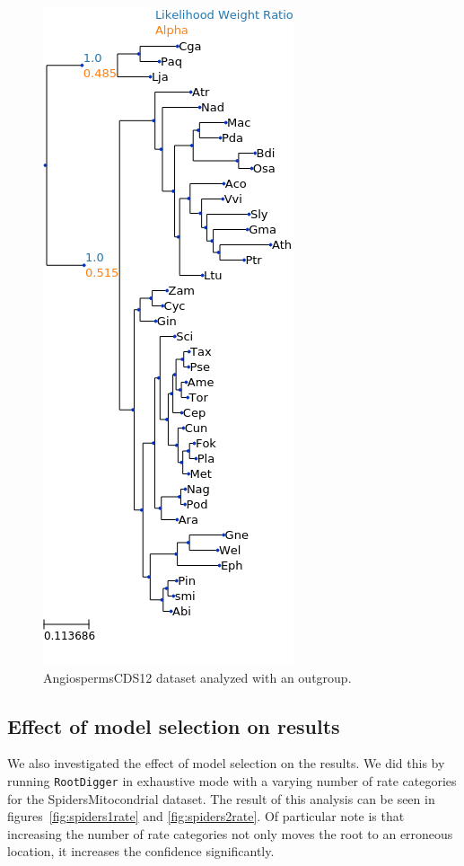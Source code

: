 \documentclass{article}
\newcommand{\RootDiggertt}{\texttt{RootDigger}}
\begin{document}
\begin{figure}
  \begin{center}
    \includegraphics[width=.5\linewidth]{figs/angio/cds12_outgroup_lwr.png}
    \caption{AngiospermsCDS12 dataset analyzed with an outgroup.}
    \label{fig:angio-cds12-outgroup}
  \end{center}
\end{figure}

\subsection{Effect of model selection on results}

We also investigated the effect of model selection on the results. We did this
by running \RootDiggertt{} in exhaustive mode with a varying number of rate
categories for the SpidersMitocondrial dataset. The result of this analysis can
be seen in figures~\ref{fig:spiders1rate} and \ref{fig:spiders2rate}. Of
particular note is that increasing the number of rate categories not only
moves the root to an erroneous location, it increases the confidence
significantly.
\end{document}
